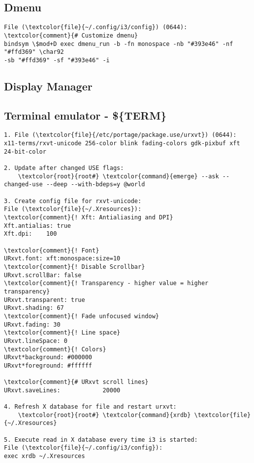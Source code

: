 \documentclass[10pt, a4paper, onecolumn, openany]{book}         %
\begin{document}

\subsection{Dmenu}
\begin{Verbatim}[commandchars=\\\{\}]
File (\textcolor{file}{~/.config/i3/config}) (0644):
\textcolor{comment}{# Customize dmenu}
bindsym \$mod+D exec dmenu_run -b -fn monospace -nb "#393e46" -nf "#ffd369" \char92
-sb "#ffd369" -sf "#393e46" -i
\end{Verbatim}
\subsection{Display Manager}


\subsection{Terminal emulator - \$\{TERM\}}
\begin{Verbatim}[commandchars=\\\{\}]
1. File (\textcolor{file}{/etc/portage/package.use/urxvt}) (0644):
x11-terms/rxvt-unicode 256-color blink fading-colors gdk-pixbuf xft 24-bit-color

2. Update after changed USE flags:
    \textcolor{root}{root#} \textcolor{command}{emerge} --ask --changed-use --deep --with-bdeps=y @world

3. Create config file for rxvt-unicode:
File (\textcolor{file}{~/.Xresources}):
\textcolor{comment}{! Xft: Antialiasing and DPI}
Xft.antialias: true
Xft.dpi:    100

\textcolor{comment}{! Font}
URxvt.font: xft:monospace:size=10
\textcolor{comment}{! Disable Scrollbar}
URxvt.scrollBar: false
\textcolor{comment}{! Transparency - higher value = higher transparency}
URxvt.transparent: true
URxvt.shading: 67
\textcolor{comment}{! Fade unfocused window}
URxvt.fading: 30
\textcolor{comment}{! Line space}
URxvt.lineSpace: 0
\textcolor{comment}{! Colors}
URxvt*background: #000000
URxvt*foreground: #ffffff

\textcolor{comment}{# URxvt scroll lines}
URxvt.saveLines:            20000

4. Refresh X database for file and restart urxvt:
    \textcolor{root}{root#} \textcolor{command}{xrdb} \textcolor{file}{~/.Xresources}
    
5. Execute read in X database every time i3 is started:
File (\textcolor{file}{~/.config/i3/config}):
exec xrdb ~/.Xresources
\end{Verbatim}
\end{document}
